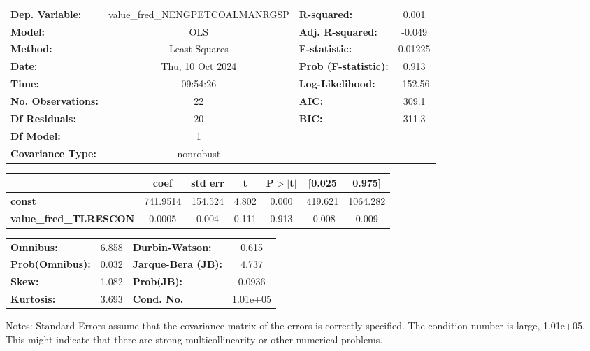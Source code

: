 \begin{center}
\begin{tabular}{lclc}
\toprule
\textbf{Dep. Variable:}        & value\_fred\_NENGPETCOALMANRGSP & \textbf{  R-squared:         } &     0.001   \\
\textbf{Model:}                &               OLS               & \textbf{  Adj. R-squared:    } &    -0.049   \\
\textbf{Method:}               &          Least Squares          & \textbf{  F-statistic:       } &   0.01225   \\
\textbf{Date:}                 &         Thu, 10 Oct 2024        & \textbf{  Prob (F-statistic):} &    0.913    \\
\textbf{Time:}                 &             09:54:26            & \textbf{  Log-Likelihood:    } &   -152.56   \\
\textbf{No. Observations:}     &                  22             & \textbf{  AIC:               } &     309.1   \\
\textbf{Df Residuals:}         &                  20             & \textbf{  BIC:               } &     311.3   \\
\textbf{Df Model:}             &                   1             & \textbf{                     } &             \\
\textbf{Covariance Type:}      &            nonrobust            & \textbf{                     } &             \\
\bottomrule
\end{tabular}
\begin{tabular}{lcccccc}
                               & \textbf{coef} & \textbf{std err} & \textbf{t} & \textbf{P$> |$t$|$} & \textbf{[0.025} & \textbf{0.975]}  \\
\midrule
\textbf{const}                 &     741.9514  &      154.524     &     4.802  &         0.000        &      419.621    &     1064.282     \\
\textbf{value\_fred\_TLRESCON} &       0.0005  &        0.004     &     0.111  &         0.913        &       -0.008    &        0.009     \\
\bottomrule
\end{tabular}
\begin{tabular}{lclc}
\textbf{Omnibus:}       &  6.858 & \textbf{  Durbin-Watson:     } &    0.615  \\
\textbf{Prob(Omnibus):} &  0.032 & \textbf{  Jarque-Bera (JB):  } &    4.737  \\
\textbf{Skew:}          &  1.082 & \textbf{  Prob(JB):          } &   0.0936  \\
\textbf{Kurtosis:}      &  3.693 & \textbf{  Cond. No.          } & 1.01e+05  \\
\bottomrule
\end{tabular}
\end{center}

Notes: \newline
 [1] Standard Errors assume that the covariance matrix of the errors is correctly specified. \newline
 [2] The condition number is large, 1.01e+05. This might indicate that there are \newline
 strong multicollinearity or other numerical problems.